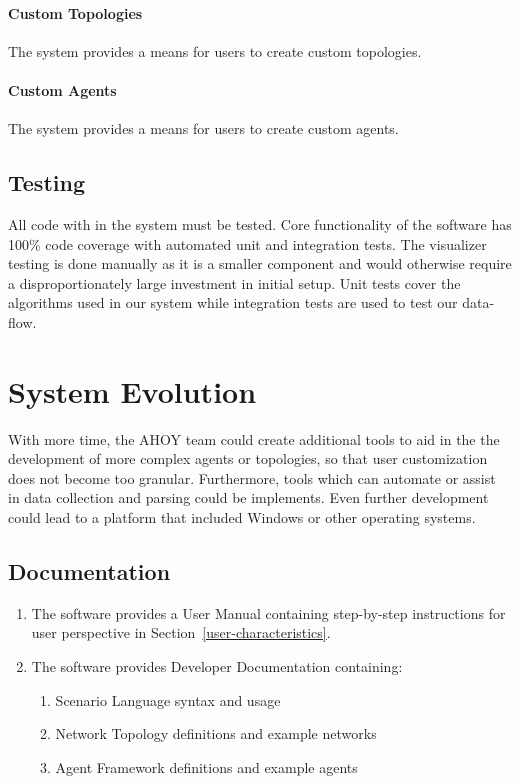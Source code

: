 \documentclass[titlepage]{article}
\begin{document}
    \paragraph{Custom Topologies} The system provides a means for users to create custom topologies.
    \paragraph{Custom Agents} The system provides a means for users to create custom agents.

\subsection{Testing%
    \label{testing}%
}
All code with in the system must be tested. Core functionality of the software has 100\% code coverage with automated unit and integration tests.  The visualizer testing is done manually as it is a smaller component and would otherwise require a disproportionately large investment in initial setup.  Unit tests cover the algorithms used in our system while integration tests are used to test our data-flow.  

\section{System Evolution}

With more time, the AHOY team could create additional tools to aid in the the development of more complex agents or topologies, so that user customization does not become too granular.  Furthermore, tools which can automate or assist in data collection and parsing could be implements.  Even further development could lead to a platform that included Windows or other operating systems.


\subsection{Documentation%
  \label{documentation}%
}
\begin{enumerate}
    \item The software provides a User Manual containing step-by-step instructions for user perspective in Section~\ref{user-characteristics}.
    \item The software provides Developer Documentation containing:
    \begin{enumerate}
        \item Scenario Language syntax and usage
        \item Network Topology definitions and example networks
        \item Agent Framework definitions and example agents
    \end{enumerate}
\end{enumerate}


\appendix
\pagebreak
\end{document}
